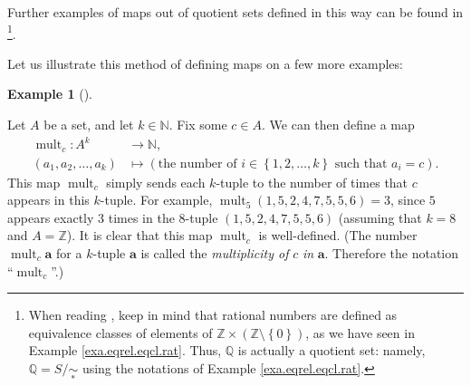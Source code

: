 \documentclass[numbers=enddot,12pt,final,onecolumn,notitlepage]{scrartcl}%
\numberwithin{exer}{subsection}
\theoremstyle{definition}
\newtheorem{exam}[theo]{Example}
\newenvironment{example}[1][]
{\begin{exam}[#1]\begin{leftbar}}
{\end{leftbar}\end{exam}}
\newenvironment{fineprint}{\begin{small}}{\end{small}}
\begin{document}
Further examples of maps out of quotient sets defined in this way can be found
in \cite{Conrad-Well}\footnote{When reading \cite[Example 1.1]{Conrad-Well},
keep in mind that rational numbers are defined as equivalence classes of
elements of $\mathbb{Z}\times\left(  \mathbb{Z}\setminus\left\{  0\right\}
\right)  $, as we have seen in Example \ref{exa.eqrel.eqcl.rat}. Thus,
$\mathbb{Q}$ is actually a quotient set: namely, $\mathbb{Q}=S/\underset{\ast
}{\sim}$ using the notations of Example \ref{exa.eqrel.eqcl.rat}.}.

\begin{fineprint}
Let us illustrate this method of defining maps on a few more examples:

\begin{example}
Let $A$ be a set, and let $k\in\mathbb{N}$. Fix some $c\in A$. We can then
define a map%
\begin{align*}
\operatorname*{mult}\nolimits_{c}:A^{k}  &  \rightarrow\mathbb{N},\\
\left(  a_{1},a_{2},\ldots,a_{k}\right)   &  \mapsto\left(  \text{the number
of }i\in\left\{  1,2,\ldots,k\right\}  \text{ such that }a_{i}=c\right)  .
\end{align*}
This map $\operatorname*{mult}\nolimits_{c}$ simply sends each $k$-tuple to
the number of times that $c$ appears in this $k$-tuple. For example,
$\operatorname*{mult}\nolimits_{5}\left(  1,5,2,4,7,5,5,6\right)  =3$, since
$5$ appears exactly $3$ times in the $8$-tuple $\left(
1,5,2,4,7,5,5,6\right)  $ (assuming that $k=8$ and $A=\mathbb{Z}$). It is
clear that this map $\operatorname*{mult}\nolimits_{c}$ is well-defined. (The
number $\operatorname*{mult}\nolimits_{c}\mathbf{a}$ for a $k$-tuple
$\mathbf{a}$ is called the \textit{multiplicity of }$c$ \textit{in
}$\mathbf{a}$. Therefore the notation \textquotedblleft$\operatorname*{mult}%
\nolimits_{c}$\textquotedblright.)


\end{example}
\end{fineprint}
\end{document}
